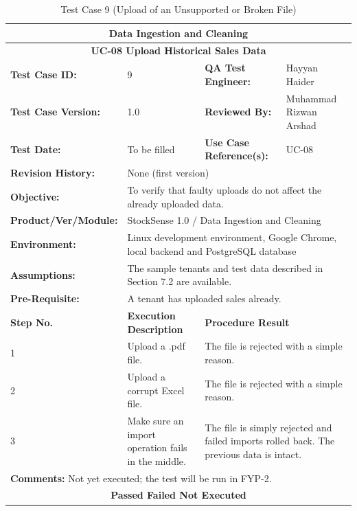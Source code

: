 \documentclass{StockSense}
\begin{document}
\begin{table}[!htbp]
\centering
\caption{Test Case 9 (Upload of an Unsupported or Broken File)}
{\small\linespread{1}\selectfont
\begin{tabular}{|p{}|p{}|p{}|p{}|}
\hline
\multicolumn{4}{|c|}{\textbf{Data Ingestion and Cleaning}} \\ \hline
\multicolumn{4}{|c|}{\textbf{UC-08 Upload Historical Sales Data}} \\ \hline
\textbf{Test Case ID:} & 9 & \textbf{QA Test Engineer:} & Hayyan Haider \\ \hline
\textbf{Test Case Version:} & 1.0 & \textbf{Reviewed By:} & Muhammad Rizwan Arshad \\ \hline
\textbf{Test Date:} & To be filled & \textbf{Use Case Reference(s):} & UC-08 \\ \hline
\textbf{Revision History:} & \multicolumn{3}{p{\dimexpr0.70\textwidth+4\tabcolsep\relax}|}{None (first version)} \\ \hline
\textbf{Objective:} & \multicolumn{3}{p{\dimexpr0.70\textwidth+4\tabcolsep\relax}|}{To verify that faulty uploads do not affect the already uploaded data.} \\ \hline
\textbf{Product/Ver/Module:} & \multicolumn{3}{p{\dimexpr0.70\textwidth+4\tabcolsep\relax}|}{StockSense 1.0 / Data Ingestion and Cleaning} \\ \hline
\textbf{Environment:} & \multicolumn{3}{p{\dimexpr0.70\textwidth+4\tabcolsep\relax}|}{Linux development environment, Google Chrome, local backend and PostgreSQL database} \\ \hline
\textbf{Assumptions:} & \multicolumn{3}{p{\dimexpr0.70\textwidth+4\tabcolsep\relax}|}{The sample tenants and test data described in Section 7.2 are available.} \\ \hline
\textbf{Pre-Requisite:} & \multicolumn{3}{p{\dimexpr0.70\textwidth+4\tabcolsep\relax}|}{A tenant has uploaded sales already.} \\ \hline
\textbf{Step No.} & \textbf{Execution Description} & \multicolumn{2}{l|}{\textbf{Procedure Result}} \\ \hline
1 & Upload a .pdf file. & \multicolumn{2}{p{\dimexpr0.42\textwidth+2\tabcolsep\relax}|}{The file is rejected with a simple reason.} \\ \hline
2 & Upload a corrupt Excel file. & \multicolumn{2}{p{\dimexpr0.42\textwidth+2\tabcolsep\relax}|}{The file is rejected with a simple reason.} \\ \hline
3 & Make sure an import operation fails in the middle. & \multicolumn{2}{p{\dimexpr0.42\textwidth+2\tabcolsep\relax}|}{The file is simply rejected and failed imports rolled back. The previous data is intact.} \\ \hline
\multicolumn{4}{|l|}{\textbf{Comments:} Not yet executed; the test will be run in FYP-2.} \\ \hline
\multicolumn{4}{|c|}{\textbf{Passed \quad Failed \quad Not Executed}} \\ \hline
\end{tabular}\par}
\end{table}
\end{document}
